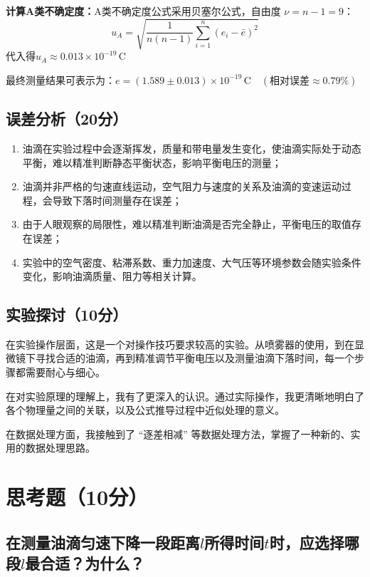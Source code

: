 \documentclass[yuxi]{../template/Report}%
\begin{document}
\begin{fullreportonly}
\vspace{2mm}
\textbf{计算A类不确定度：}A类不确定度公式采用贝塞尔公式，自由度 \( \nu = n-1 = 9 \)：
\[u_A = \sqrt{\frac{1}{n(n-1)} \sum_{i=1}^n (e_i - \bar{e})^2}\]
代入得$u_A \approx 0.013 \times 10^{-19} \, \text{C}$

\vspace{2mm}
最终测量结果可表示为：\(e = (1.589 \pm 0.013) \times 10^{-19} \, \text{C} \quad (\text{相对误差} \approx 0.79\%)\)
\subsection{误差分析（20分）}
\begin{enumerate}
    \item 油滴在实验过程中会逐渐挥发，质量和带电量发生变化，使油滴实际处于动态平衡，难以精准判断静态平衡状态，影响平衡电压的测量；
    \item 油滴并非严格的匀速直线运动，空气阻力与速度的关系及油滴的变速运动过程，会导致下落时间测量存在误差；
    \item 由于人眼观察的局限性，难以精准判断油滴是否完全静止，平衡电压的取值存在误差；
    \item 实验中的空气密度、粘滞系数、重力加速度、大气压等环境参数会随实验条件变化，影响油滴质量、阻力等相关计算。
\end{enumerate}

\subsection{实验探讨（10分）}
在实验操作层面，这是一个对操作技巧要求较高的实验。从喷雾器的使用，到在显微镜下寻找合适的油滴，再到精准调节平衡电压以及测量油滴下落时间，每一个步骤都需要耐心与细心。

\vspace{2mm}
在对实验原理的理解上，我有了更深入的认识。通过实际操作，我更清晰地明白了各个物理量之间的关联，以及公式推导过程中近似处理的意义。

\vspace{2mm}
在数据处理方面，我接触到了 “逐差相减” 等数据处理方法，掌握了一种新的、实用的数据处理思路。

\section{思考题（10分）}
\subsection{在测量油滴匀速下降一段距离$l$所得时间$t$时，应选择哪段$l$最合适？为什么？}


\end{fullreportonly}
\end{document}
